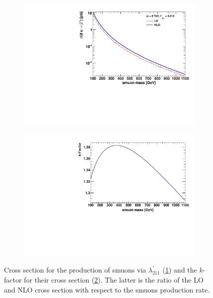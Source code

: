 \begin{figure}[!htb]
  \centering
  \begin{subfigure}[b]{0.495\textwidth}
    \centering
    \includegraphics[width=\textwidth]{plots/xs.pdf}
    \caption{\label{fig:xs-smuon}}
  \end{subfigure}
  \begin{subfigure}[b]{0.495\textwidth}
    \centering
    \includegraphics[width=\textwidth]{plots/k_smuon.pdf}
    \caption{\label{fig:k-smuon}}
  \end{subfigure}
  \caption{Cross section for the production of smuons via $\lambda^\prime_{211}$ (\ref{fig:xs-smuon}) and the $k$-factor for their cross section (\ref{fig:k-smuon}). The latter is the ratio of the LO and NLO cross section with respect to the smuons production rate.}
  \label{fig:susys-xs-kfactor}
\end{figure}

